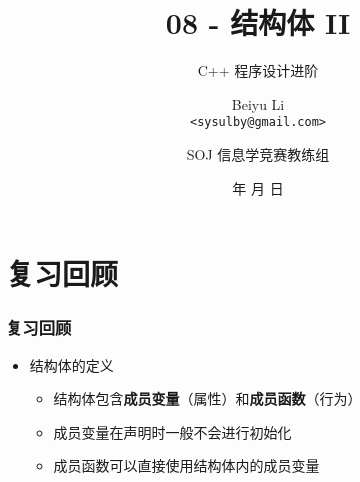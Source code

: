 \title[08 - 结构体 II]
{08 - 结构体 II}

\subtitle{C++ 程序设计进阶}

\author[Beiyu Li]
{Beiyu Li\\
\texttt{<sysulby@gmail.com>}}


\date[\today]
{\number\year 年 \number\month 月 \number\day 日}




\author[sysulby]
{SOJ 信息学竞赛教练组}

\begin{frame}
    \titlepage
\end{frame}
\setcounter{framenumber}{0} %


\section{复习回顾}

\begin{frame}[fragile]
    \frametitle{复习回顾}

    \begin{itemize}
        \item 结构体的定义
        
        

         {
            \begin{itemize}
                \item<2-> 结构体包含\textbf{成员变量}（属性）和\textbf{成员函数}（行为）
                \item<3-> 成员变量在声明时一般不会进行初始化
                \item<4-> 成员函数可以直接使用结构体内的成员变量
            \end{itemize}
        }
        
    \end{itemize}
    
\end{frame}

